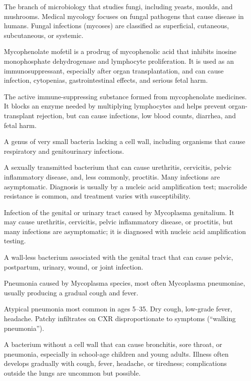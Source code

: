  The branch of microbiology that studies fungi, including yeasts, moulds, and mushrooms.
Medical mycology focuses on fungal pathogens that cause disease in humans. Fungal
infections (mycoses) are classified as superficial, cutaneous, subcutaneous, or
systemic.

 Mycophenolate mofetil is a prodrug of mycophenolic acid that inhibits inosine monophosphate dehydrogenase and lymphocyte proliferation. It is used as an immunosuppressant, especially after organ transplantation, and can cause infection, cytopenias, gastrointestinal effects, and serious fetal harm.

 The active immune-suppressing substance formed from mycophenolate medicines. It blocks an enzyme needed by multiplying lymphocytes and helps prevent organ-transplant rejection, but can cause infections, low blood counts, diarrhea, and fetal harm.

 A genus of very small bacteria lacking a cell wall, including organisms that cause respiratory and genitourinary infections.

 A sexually transmitted bacterium that can cause urethritis, cervicitis, pelvic
inflammatory disease, and, less commonly, proctitis. Many infections are asymptomatic.
Diagnosis is usually by a nucleic acid amplification test; macrolide resistance is common,
and treatment varies with susceptibility.

 Infection of the genital or urinary tract caused by Mycoplasma genitalium. It may cause urethritis, cervicitis, pelvic inflammatory disease, or proctitis, but many infections are asymptomatic; it is diagnosed with nucleic acid amplification testing.

 A wall-less bacterium associated with the genital tract that can cause pelvic, postpartum, urinary, wound, or joint infection.

 Pneumonia caused by Mycoplasma species, most often Mycoplasma pneumoniae, usually producing a gradual cough and fever.

 Atypical pneumonia most common in ages 5--35. Dry cough, low-grade fever, headache.
Patchy infiltrates on CXR disproportionate to symptoms (``walking pneumonia'').

 A bacterium without a cell wall that can cause bronchitis, sore throat, or pneumonia, especially in school-age children and young adults. Illness often develops gradually with cough, fever, headache, or tiredness; complications outside the lungs are uncommon but possible.

